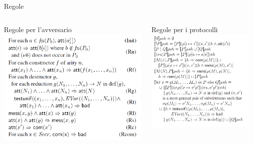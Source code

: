 \documentclass[11pt,xcolor=table]{beamer}
\begin{document}
\subsection{}
\begin{frame}{Regole}
    \begin{columns}
        \begin{column}{0.55\textwidth}
            Regole per l'avversario\\
            \includegraphics[scale=0.3]{Relazione/Immagini/term_rule.PNG}
        \end{column}
        \begin{column}{0.48\textwidth}
            Regole per i protocolli\\
            \includegraphics[scale=0.35]{Relazione/Immagini/semantic.PNG}
        \end{column}
    \end{columns}
\end{frame}
\end{document}
